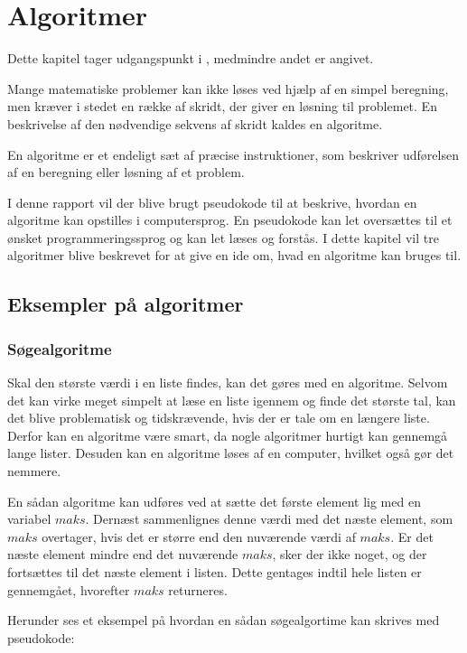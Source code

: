 \chapter{Algoritmer}
Dette kapitel tager udgangspunkt i \citep{dmat}, medmindre andet er angivet.

Mange matematiske problemer kan ikke løses ved hjælp af en simpel beregning, men kræver i stedet en række af skridt, der giver en løsning til problemet. 
En beskrivelse af den nødvendige sekvens af skridt kaldes en algoritme. 


\begin{defn}
En algoritme er et endeligt sæt af præcise instruktioner, som beskriver udførelsen af en beregning eller løsning af et problem.
\end{defn}

I denne rapport vil der blive brugt pseudokode til at beskrive, hvordan en algoritme kan opstilles i computersprog. 
En pseudokode kan let oversættes til et ønsket programmeringssprog og kan let læses og forstås. 
I dette kapitel vil tre algoritmer blive beskrevet for at give en ide om, hvad en algoritme kan bruges til. 

\section{Eksempler på algoritmer}
\subsection{Søgealgoritme}
Skal den største værdi i en liste findes, kan det gøres med en algoritme. 
Selvom det kan virke meget simpelt at læse en liste igennem og finde det største tal, kan det blive problematisk og tidskrævende, hvis der er tale om en længere liste. 
Derfor kan en algoritme være smart, da nogle algoritmer hurtigt kan gennemgå lange lister. 
Desuden kan en algoritme løses af en computer, hvilket også gør det nemmere. 

En sådan algoritme kan udføres ved at sætte det første element lig med en variabel $maks$. 
Dernæst sammenlignes denne værdi med det næste element, som  $maks$ overtager, hvis det er større end den nuværende værdi af $maks$. 
Er det næste element mindre end det nuværende $maks$, sker der ikke noget, og der fortsættes til det næste element i listen. 
Dette gentages indtil hele listen er gennemgået, hvorefter $maks$ returneres.

Herunder ses et eksempel på hvordan en sådan søgealgortime kan skrives med pseudokode:


